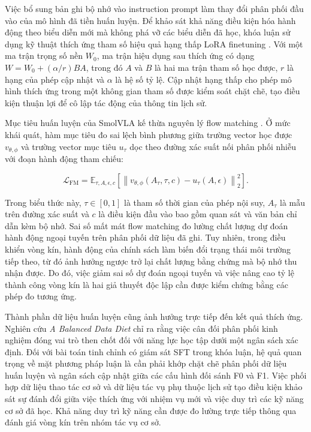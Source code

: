 Việc bổ sung bản ghi bộ nhớ vào instruction prompt làm thay đổi phân phối đầu vào của mô hình đã tiền huấn luyện. Để khảo sát khả năng điều kiện hóa hành động theo biểu diễn mới mà không phá vỡ các biểu diễn đã học, khóa luận sử dụng kỹ thuật thích ứng tham số hiệu quả hạng thấp LoRA finetuning \cite{lora2021}. Với một ma trận trọng số nền $W_0$, ma trận hiệu dụng sau thích ứng có dạng $W = W_0 + (\alpha/r)BA$, trong đó $A$ và $B$ là hai ma trận tham số học được, $r$ là hạng của phép cập nhật và $\alpha$ là hệ số tỷ lệ. Cập nhật hạng thấp cho phép mô hình thích ứng trong một không gian tham số được kiểm soát chặt chẽ, tạo điều kiện thuận lợi để cô lập tác động của thông tin lịch sử.

Mục tiêu huấn luyện của SmolVLA kế thừa nguyên lý flow matching \cite{flowmatching2023,smolvla2025}. Ở mức khái quát, hàm mục tiêu đo sai lệch bình phương giữa trường vector học được $v_{\theta,\phi}$ và trường vector mục tiêu $u_\tau$ dọc theo đường xác suất nối phân phối nhiễu với đoạn hành động tham chiếu:

\begin{equation}
\mathcal L_{\mathrm{FM}}
= \mathbb E_{\tau,A,\epsilon,c}\!
\left[\left\|v_{\theta,\phi}(A_\tau,\tau,c)-u_\tau(A,\epsilon)\right\|_2^2\right].
\end{equation}

Trong biểu thức này, $\tau \in [0, 1]$ là tham số thời gian của phép nội suy, $A_\tau$ là mẫu trên đường xác suất và $c$ là điều kiện đầu vào bao gồm quan sát và văn bản chỉ dẫn kèm bộ nhớ. Sai số mất mát flow matching đo lường chất lượng dự đoán hành động ngoại tuyến trên phân phối dữ liệu đã ghi. Tuy nhiên, trong điều khiển vòng kín, hành động của chính sách làm biến đổi trạng thái môi trường tiếp theo, từ đó ảnh hưởng ngược trở lại chất lượng bằng chứng mà bộ nhớ thu nhận được. Do đó, việc giảm sai số dự đoán ngoại tuyến và việc nâng cao tỷ lệ thành công vòng kín là hai giả thuyết độc lập cần được kiểm chứng bằng các phép đo tương ứng.

Thành phần dữ liệu huấn luyện cũng ảnh hưởng trực tiếp đến kết quả thích ứng. Nghiên cứu \textit{A Balanced Data Diet} \cite{balanceddiet2026} chỉ ra rằng việc cân đối phân phối kinh nghiệm đóng vai trò then chốt đối với năng lực học tập dưới một ngân sách xác định. Đối với bài toán tinh chỉnh có giám sát SFT trong khóa luận, hệ quả quan trọng về mặt phương pháp luận là cần phải khớp chặt chẽ phân phối dữ liệu huấn luyện và ngân sách cập nhật giữa các cấu hình đối sánh F0 và F1. Việc phối hợp dữ liệu thao tác cơ sở và dữ liệu tác vụ phụ thuộc lịch sử tạo điều kiện khảo sát sự đánh đổi giữa việc thích ứng với nhiệm vụ mới và việc duy trì các kỹ năng cơ sở đã học. Khả năng duy trì kỹ năng cần được đo lường trực tiếp thông qua đánh giá vòng kín trên nhóm tác vụ cơ sở.

